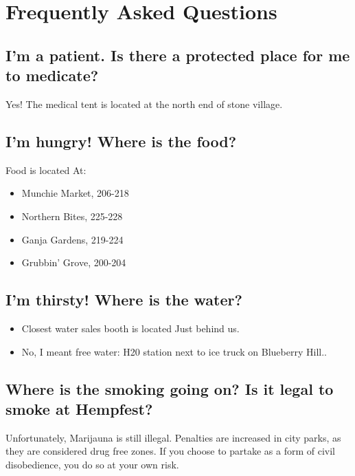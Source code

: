 \chapter{Frequently Asked Questions}


\section{I'm a patient. Is there a protected place for me to medicate?}

Yes! The medical tent is located at the north end of stone village.

\section{I'm hungry! Where is the food?} %
 Food is located At:
\begin{itemize}
	\item Munchie Market, 206-218
	\item Northern Bites, 225-228
	\item Ganja Gardens, 219-224
	\item Grubbin' Grove, 200-204
\end{itemize}

\section{I'm thirsty! Where is the water?}
\begin{itemize}
	\item Closest water sales booth is located Just behind us.
	\item No, I meant free water: H20 station next to ice truck on Blueberry Hill..
\end{itemize}


\section{Where is the smoking going on? Is it legal to smoke at Hempfest?}
Unfortunately, Marijauna is still illegal. Penalties are increased in city parks, as they are considered drug free zones. If you choose to partake as a form of civil disobedience, you do so at your own risk. 

